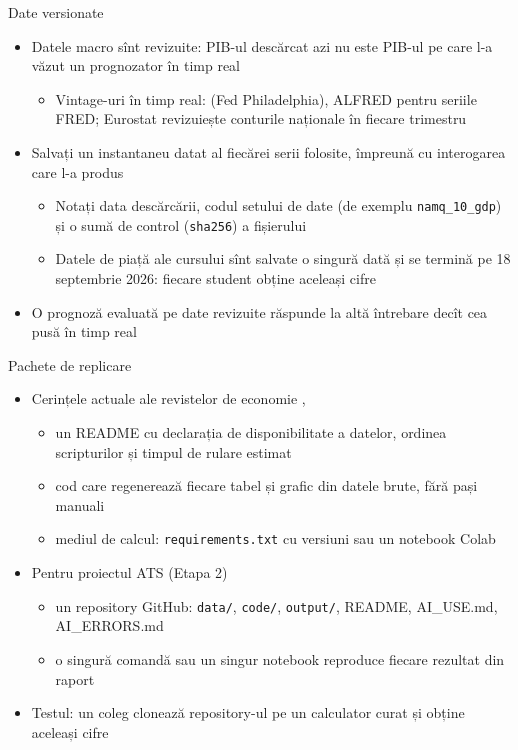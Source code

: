 \begin{frame}{Date versionate}
\itemsize{\small}
\begin{itemize}
    \item Datele macro sînt revizuite: PIB-ul descărcat azi nu este PIB-ul pe care l-a văzut un prognozator în timp real
    \begin{itemize}
        \item Vintage-uri în timp real:  (Fed Philadelphia), ALFRED pentru seriile FRED; Eurostat revizuiește conturile naționale în fiecare trimestru
    \end{itemize}
    \item Salvați un instantaneu datat al fiecărei serii folosite, împreună cu interogarea care l-a produs
    \begin{itemize}
        \item Notați data descărcării, codul setului de date (de exemplu \texttt{namq\_10\_gdp}) și o sumă de control (\texttt{sha256}) a fișierului
        \item Datele de piață ale cursului sînt salvate o singură dată și se termină pe 18 septembrie 2026: fiecare student obține aceleași cifre
    \end{itemize}
    \item O prognoză evaluată pe date revizuite răspunde la altă întrebare decît cea pusă în timp real
\end{itemize}
\end{frame}

\begin{frame}{Pachete de replicare}
\itemsize{\small}
\begin{itemize}
    \item Cerințele actuale ale revistelor de economie , 
    \begin{itemize}
        \item un README cu declarația de disponibilitate a datelor, ordinea scripturilor și timpul de rulare estimat
        \item cod care regenerează fiecare tabel și grafic din datele brute, fără pași manuali
        \item mediul de calcul: \texttt{requirements.txt} cu versiuni sau un notebook Colab
    \end{itemize}
    \item Pentru proiectul ATS (Etapa 2)
    \begin{itemize}
        \item un repository GitHub: \texttt{data/}, \texttt{code/}, \texttt{output/}, README, AI\_USE.md, AI\_ERRORS.md
        \item o singură comandă sau un singur notebook reproduce fiecare rezultat din raport
    \end{itemize}
    \item Testul: un coleg clonează repository-ul pe un calculator curat și obține aceleași cifre
\end{itemize}
\end{frame}

